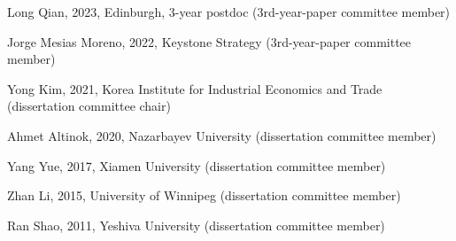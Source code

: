 \documentclass[11pt]{article}
\begin{document}
Long Qian, 2023, Edinburgh, 3-year postdoc (3rd-year-paper committee member)

 

Jorge Mesias Moreno, 2022, Keystone Strategy (3rd-year-paper committee member)


 

Yong Kim, 2021, Korea Institute for Industrial Economics and Trade (dissertation committee chair)

 

Ahmet Altinok, 2020, Nazarbayev University (dissertation committee member)




 

Yang Yue, 2017, Xiamen University (dissertation committee member) 
 


Zhan Li, 2015, University of Winnipeg (dissertation committee member) 


 
Ran Shao, 2011, Yeshiva University (dissertation committee member) 

 \ \ 

 
\end{document}
